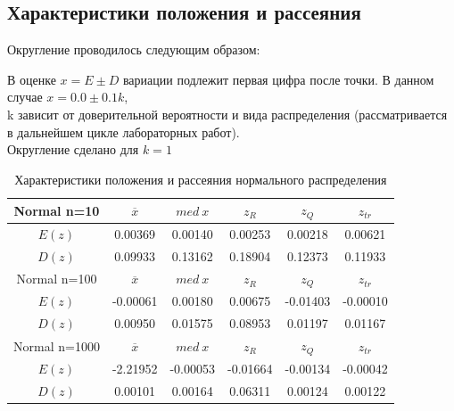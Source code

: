 \subsection{Характеристики положения и рассеяния}

Округление проводилось следующим образом: 

В оценке $x = E \pm D$ вариации подлежит первая цифра после точки. В данном случае $x = 0.0 \pm 0.1k$, \\
k зависит от доверительной вероятности и вида распределения (рассматривается в дальнейшем цикле лабораторных работ).\\
Округление сделано для $k=1$
 

\begin{table}[H]
	\begin{center}
		\begin{tabular}{|c||c|c|c|c|c|}
			\hline
			Normal n=10 & $\overline{x} $ & $med\:x$ & $z_{R}$ & $z_{Q}$ & $z_{tr}$ \\
			\hline\hline
			$E(z)$ & 0.00369 & 0.00140 & 0.00253 & 0.00218 & 0.00621 \\
			\hline
			$D(z)$ & 0.09933 & 0.13162 & 0.18904 & 0.12373 & 0.11933 \\
			\hline\hline
			Normal n=100 & $\overline{x} $ & $med\:x$ & $z_{R}$ & $z_{Q}$ & $z_{tr}$ \\
			\hline\hline
			$E(z)$ & -0.00061 & 0.00180 & 0.00675 & -0.01403 & -0.00010 \\
			\hline
			$D(z)$ & 0.00950 & 0.01575&  0.08953& 0.01197 & 0.01167  \\
			\hline\hline
			Normal n=1000 & $\overline{x} $ & $med\:x$ & $z_{R}$ & $z_{Q}$ & $z_{tr}$ \\
			\hline\hline
			$E(z)$ & -2.21952 & -0.00053 & -0.01664 & -0.00134 &   -0.00042 \\
			\hline
			$D(z)$ & 0.00101  & 0.00164 & 0.06311  &0.00124  & 0.00122 \\
			\hline
		\end{tabular}
	\end{center}
	\caption{Характеристики положения и рассеяния нормального распределения}
\end{table} 

